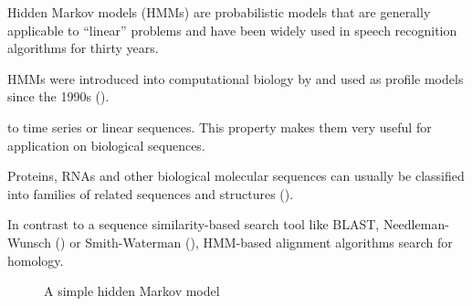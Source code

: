 Hidden Markov models (HMMs) are probabilistic models that are generally
applicable to ``linear'' problems and have been widely used in speech
recognition algorithms for thirty years. 

HMMs were introduced into computational biology by \cite{churchill1989} and
used as profile models since the 1990s (\cite{krogh1994}).

to time series or linear sequences.  This property makes them very useful for
application on biological sequences.

Proteins, RNAs and other biological molecular sequences can usually be
classified into families of related sequences and structures
(\cite{henikoff1997}).

In contrast to a sequence similarity-based search tool like BLAST,
Needleman-Wunsch (\cite{needleman1970}) or Smith-Waterman (\cite{smith1981}),
HMM-based alignment algorithms search for homology. 

\begin{figure}[h]
	\begin{center}
		\def\svgwidth{0.8\textwidth}
		
	\end{center}
	\caption[A simple hidden Markov model]{A simple hidden Markov model}
	\label{fig:hmm}
\end{figure}
